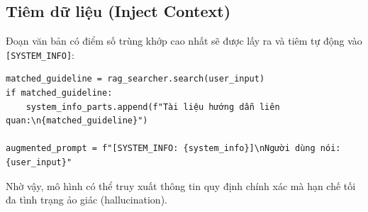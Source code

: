 \documentclass[12pt]{article}
\begin{document}
\subsection{Tiêm dữ liệu (Inject Context)}
Đoạn văn bản có điểm số trùng khớp cao nhất sẽ được lấy ra và tiêm tự động vào \texttt{[SYSTEM\_INFO]}:

\begin{mdframed}[backgroundcolor=gray!10]
\begin{verbatim}
matched_guideline = rag_searcher.search(user_input)
if matched_guideline:
    system_info_parts.append(f"Tài liệu hướng dẫn liên quan:\n{matched_guideline}")
    
augmented_prompt = f"[SYSTEM_INFO: {system_info}]\nNgười dùng nói: {user_input}"
\end{verbatim}
\end{mdframed}

Nhờ vậy, mô hình có thể truy xuất thông tin quy định chính xác mà hạn chế tối đa tình trạng ảo giác (hallucination).
\end{document}
